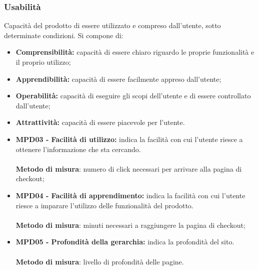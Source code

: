 \subsubsection{Usabilità}
Capacità del prodotto di essere utilizzato e compreso dall'utente, sotto determinate condizioni. Si compone di:
\begin{itemize}
    \item \textbf{Comprensibilità: }capacità di essere chiaro riguardo le proprie funzionalità e il proprio utilizzo;
    \item \textbf{Apprendibilità: }capacità di essere facilmente appreso dall'utente;
    \item \textbf{Operabilità: }capacità di eseguire gli scopi dell'utente e di essere controllato dall'utente;
    \item \textbf{Attrattività: }capacità di essere piacevole per l'utente.
\end{itemize}
\begin{itemize}
    \item \textbf{MPD03 - Facilità di utilizzo:} indica la facilità con cui l'utente riesce a ottenere l'informazione che sta cercando.\\
    \\\textbf{Metodo di misura}: numero di click necessari per arrivare alla pagina di checkout;
    \item \textbf{MPD04 - Facilità di apprendimento:} indica la facilità con cui l'utente riesce a imparare l'utilizzo delle funzionalità del prodotto.\\
    \\\textbf{Metodo di misura}: minuti necessari a raggiungere la pagina di checkout;
    \item \textbf{MPD05 - Profondità della gerarchia:} indica la profondità del sito.\\
    \\\textbf{Metodo di misura}: livello di profondità delle pagine.
\end{itemize}
